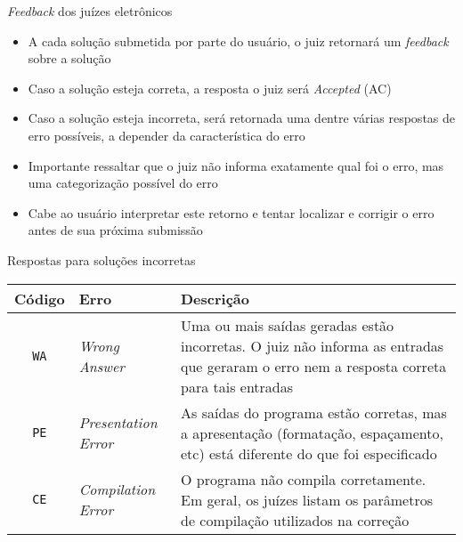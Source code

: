 \begin{frame}[fragile]{\textit{Feedback} dos juízes eletrônicos}

    \begin{itemize}
        \item A cada solução submetida por parte do usuário, o juiz retornará um \textit{feedback}
        sobre a solução
        \item Caso a solução esteja correta, a resposta o juiz será \textit{Accepted} (AC)
        \item Caso a solução esteja incorreta, será retornada uma dentre várias respostas de 
        erro possíveis, a depender da característica do erro
        \item Importante ressaltar que o juiz não informa exatamente qual foi o erro, mas uma
        categorização possível do erro
        \item Cabe ao usuário interpretar este retorno e tentar localizar e corrigir o erro 
        antes de sua próxima submissão
    \end{itemize}

\end{frame}

\begin{frame}[fragile]{Respostas para soluções incorretas}

    \begin{center}
        \begin{tabularx}{\textwidth}{clX}
            \toprule
            \textbf{Código} & \textbf{Erro} & \textbf{Descrição} \\
            \midrule
            \texttt{WA} & \textit{Wrong Answer} & Uma ou mais saídas geradas estão incorretas. O juiz  não informa as entradas que geraram o erro nem a resposta correta para tais entradas   \\
            \midrule
            \rowcolor[gray]{0.9}
            \texttt{PE} & \textit{Presentation Error} & As saídas do programa estão corretas, mas a apresentação (formatação,  espaçamento,  etc)  está diferente do que foi especificado \\
            \midrule
            \texttt{CE} & \textit{Compilation Error} & O programa  não  compila  corretamente.
  Em geral, os juízes listam os parâmetros de compilação utilizados na correção \\
        \bottomrule
        \end{tabularx}
    \end{center}

\end{frame}

